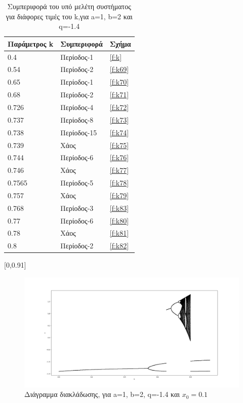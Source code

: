 \begin{table}[h!]
	\centering
	\begin{tabular}{l | l | l}
		Παράμετρος k & Συμπεριφορά & Σχήμα\\
		\hline
		0.4 &  Περίοδος-1 & \ref{f:k}\\
		0.54 &  Περίοδος-2 & \ref{f:k69}\\
		0.65& Περίοδος-1 & \ref{f:k70}\\
		0.68& Περίοδος-2 & \ref{f:k71}\\
		0.726 &  Περίοδος-4 & \ref{f:k72}\\
		0.737& Περίοδος-8 & \ref{f:k73}\\
		0.738& Περίοδος-15 & \ref{f:k74}\\
		0.739& Χάος & \ref{f:k75}\\
		0.744 &  Περίοδος-6 & \ref{f:k76}\\
		0.746 &  Χάος & \ref{f:k77}\\
		0.7565 &  Περίοδος-5 & \ref{f:k78}\\
		0.757 &  Χάος & \ref{f:k79}\\
		0.768 &  Περίοδος-3 & \ref{f:k83}\\
		0.77 &  Περίοδος-6 & \ref{f:k80}\\
		0.78 &  Χάος & \ref{f:k81}\\
		0.8 & Περίοδος-2&\ref{f:k82}\\
	\end{tabular}
	\caption{ Συμπεριφορά του υπό μελέτη συστήματος για διάφορες τιμές του k,για a=1, b=2 και q=-1.4}
	\label{tab:abc6}
\end{table}

[0,0.91]

\begin{figure}[h!]
	\centering
	\includegraphics[width=0.8\linewidth]{LateX images/graphs q14/g1}
	\caption{ Διάγραμμα διακλάδωσης, για a=1, b=2, q=-1.4 και \(x_0=0.1\)}
	\label{f:g19}
\end{figure}

